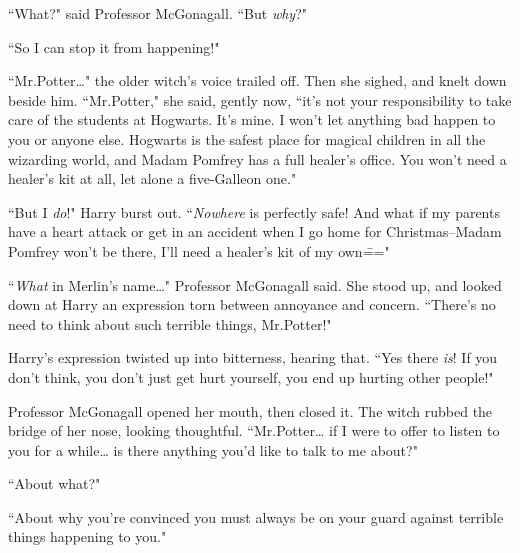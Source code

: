 ``What?" said Professor McGonagall. ``But \emph{why}?"

``So I can stop it from happening!"

``Mr.\?Potter{\ldots}" the older witch's voice trailed off. Then she sighed, and knelt down beside him. ``Mr.\?Potter," she said, gently now, ``it's not your responsibility to take care of the students at Hogwarts. It's mine. I won't let anything bad happen to you or anyone else. Hogwarts is the safest place for magical children in all the wizarding world, and Madam Pomfrey has a full healer's office. You won't need a healer's kit at all, let alone a five-Galleon one."

``But I \emph{do}!" Harry burst out. ``\emph{Nowhere} is perfectly safe! And what if my parents have a heart attack or get in an accident when I go home for Christmas\---Madam Pomfrey won't be there, I'll need a healer's kit of my own\==="

``\emph{What} in Merlin's name{\ldots}" Professor McGonagall said. She stood up, and looked down at Harry an expression torn between annoyance and concern. ``There's no need to think about such terrible things, Mr.\?Potter!"

Harry's expression twisted up into bitterness, hearing that. ``Yes there \emph{is}! If you don't think, you don't just get hurt yourself, you end up hurting other people!"

Professor McGonagall opened her mouth, then closed it. The witch rubbed the bridge of her nose, looking thoughtful. ``Mr.\?Potter{\ldots} if I were to offer to listen to you for a while{\ldots} is there anything you'd like to talk to me about?"

``About what?"

``About why you're convinced you must always be on your guard against terrible things happening to you."

